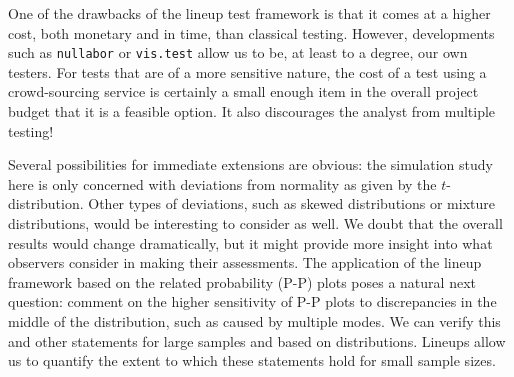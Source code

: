 \documentclass{article}\usepackage[]{graphicx}\usepackage[]{color}
\begin{document}
One of the drawbacks of the lineup test framework is that it comes at a higher cost, both monetary and in time, than classical testing.
However, developments such as {\tt nullabor} \citep{nullabor} or {\tt vis.test} \citep{vistest} allow us to be, at least to a degree, our own testers. For tests that are of a more sensitive nature, the cost of a test using a crowd-sourcing service is certainly a small enough item in the overall project budget that it is a feasible 
option. It also discourages the analyst from multiple testing!

Several possibilities for immediate extensions are obvious: the simulation study here is only concerned with deviations from normality as given by the $t$-distribution. Other types of deviations, such as skewed distributions or mixture distributions, would be interesting to consider as well. We doubt that the overall results would change dramatically, but it might provide more insight into what observers consider in making their assessments. 
The application of the lineup framework based on the related probability (P-P) plots poses a natural next question: \citet{koehler91} comment on the higher sensitivity of  P-P plots  to discrepancies in the middle of the distribution, such as caused by multiple modes. We can verify this and other statements for large samples and based on distributions. Lineups allow us to quantify the extent to which these statements hold for small sample sizes.




\end{document}
